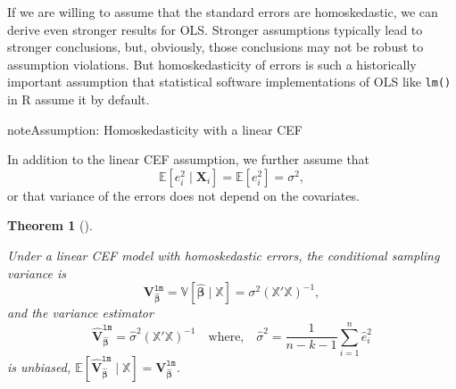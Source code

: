 \documentclass[
  13pt,
  letterpaper,
  DIV=11,
  numbers=noendperiod]{scrreprt}
\newcommand{\mb}{\bm}
\newcommand{\E}{\mathbb{E}}
\newcommand{\V}{\mathbb{V}}
\newcommand{\X}{\mb{X}}
\newcommand{\Xmat}{\mathbb{X}}
\newcommand{\bhat}{\widehat{\mb{\beta}}}
\theoremstyle{plain}
\newtheorem{theorem}{Theorem}[chapter]
\theoremstyle{plain}
\theoremstyle{definition}
\theoremstyle{definition}
\theoremstyle{remark}
\begin{document}
If we are willing to assume that the standard errors are homoskedastic,
we can derive even stronger results for OLS. Stronger assumptions
typically lead to stronger conclusions, but, obviously, those
conclusions may not be robust to assumption violations. But
homoskedasticity of errors is such a historically important assumption
that statistical software implementations of OLS like \texttt{lm()} in R
assume it by default.

\begin{bookcallout}{note}{Assumption: Homoskedasticity with a linear CEF}

In addition to the linear CEF assumption, we further assume that \[
\E[e_i^2 \mid \X_i] = \E[e_i^2] = \sigma^2,
\] or that variance of the errors does not depend on the covariates.

\end{bookcallout}

\begin{theorem}[]\protect\hypertarget{thm-homoskedasticity}{}\label{thm-homoskedasticity}

Under a linear CEF model with homoskedastic errors, the conditional
sampling variance is \[
\mb{V}^{\texttt{lm}}_{\bhat} = \V[\bhat \mid \Xmat] = \sigma^2 \left( \Xmat'\Xmat \right)^{-1},
\] and the variance estimator \[
\widehat{\mb{V}}^{\texttt{lm}}_{\bhat} = \widehat{\sigma}^2 \left( \Xmat'\Xmat \right)^{-1} \quad\text{where,}\quad \widehat{\sigma}^2 = \frac{1}{n - k - 1} \sum_{i=1}^n \widehat{e}_i^2
\] is unbiased,
\(\E[\widehat{\mb{V}}^{\texttt{lm}}_{\bhat} \mid \Xmat] = \mb{V}^{\texttt{lm}}_{\bhat}\).

\end{theorem}
\end{document}
